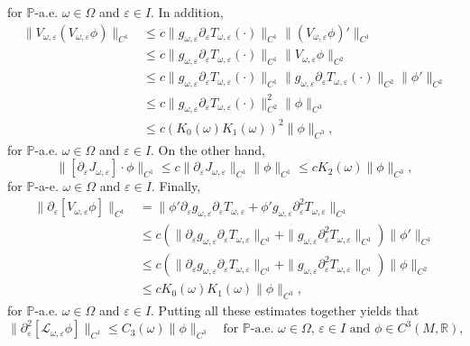 \documentclass[11pt,reqno,a4paper]{article}
\theoremstyle{special}
\renewcommand{\epsilon}{\varepsilon}
\renewcommand{\L}{\mathcal{L}}
\def\R{\mathbb{R}}
\begin{document}
for $\mathbb P$-a.e. $\omega \in \Omega$ and $\epsilon \in I$.
In addition,
	\[
	\begin{split}
		\|V_{\omega,\epsilon}(V_{\omega,\epsilon}\phi)\|_{C^1} &\le c\|g_{\omega, \epsilon} \partial_{\epsilon}T_{\omega, \epsilon}(\cdot)\|_{C^1}  \|(V_{\omega,\epsilon}\phi)'\|_{C^1} \\
		&\le c\|g_{\omega, \epsilon} \partial_{\epsilon}T_{\omega, \epsilon}(\cdot)\|_{C^1}\|V_{\omega,\epsilon}\phi \|_{C^2} \\
		&\le c\|g_{\omega, \epsilon} \partial_{\epsilon}T_{\omega, \epsilon}(\cdot)\|_{C^1}\|g_{\omega, \epsilon} \partial_{\epsilon}T_{\omega, \epsilon}(\cdot)\|_{C^2}  \|\phi '\|_{C^2} \\
		&\le c\|g_{\omega, \epsilon} \partial_{\epsilon}T_{\omega, \epsilon}(\cdot)\|_{C^2}^2 \|\phi \|_{C^3}\\
		&\le c(K_0(\omega)K_1(\omega))^2\|\phi \|_{C^3},
	\end{split}
	\]
 for $\mathbb P$-a.e. $\omega \in \Omega$ and $\epsilon \in I$. On the other hand, 
 \[
 \| [\partial_\epsilon J_{\omega,\epsilon}]\cdot \phi\|_{C^1} \le c\| \partial_\epsilon J_{\omega,\epsilon}\|_{C^1}  \|\phi \|_{C^1} \le cK_2(\omega)\|\phi\|_{C^3},
 \]
 for $\mathbb P$-a-e. $\omega \in \Omega$ and $\epsilon \in I$. Finally, 
 \[
 \begin{split}
		\|\partial_{\epsilon}[V_{\omega,\epsilon}\phi]\|_{C^1} &=\|\phi' \partial_\epsilon g_{\omega, \epsilon}\partial_{\epsilon}T_{\omega, \epsilon}+\phi' g_{\omega, \epsilon} \partial_\epsilon^2 T_{\omega, \epsilon}\|_{C^1} \\
		&\le c\left(\|\partial_\epsilon g_{\omega, \epsilon}\partial_{\epsilon}T_{\omega, \epsilon} \|_{C^1}+
		\|g_{\omega, \epsilon} \partial_\epsilon^2 T_{\omega, \epsilon}\|_{C^1}\right)\|\phi'\|_{C^1} \\
		&\le c \left(\|\partial_\epsilon g_{\omega, \epsilon}\partial_{\epsilon}T_{\omega, \epsilon} \|_{C^1}+
		\|g_{\omega, \epsilon} \partial_\epsilon^2 T_{\omega, \epsilon}\|_{C^1}\right) \| \phi \|_{C^2}\\
		&\le cK_0(\omega)K_1(\omega) \| \phi \|_{C^3},
	\end{split}
 \]
 for $\mathbb P$-a.e. $\omega \in \Omega$ and $\epsilon \in I$. Putting all these estimates together yields that 
 \begin{equation}\label{kre}
 \|		\partial_{\epsilon}^2[\L_{\omega, \epsilon}\phi]\|_{C^1} \le C_3(\omega) \| \phi \|_{C^3} \quad \text{for $\mathbb P$-a.e. $\omega \in \Omega$, $\epsilon \in I$ and $\phi \in C^3(M, \R)$,}
 \end{equation}
\end{document}

